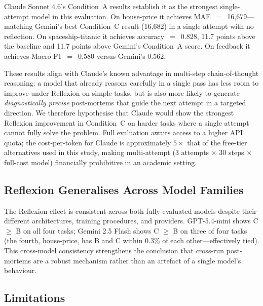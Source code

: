 \documentclass[conference]{IEEEtran}
\begin{document}
Claude Sonnet 4.6's Condition~A results establish it as the strongest
single-attempt model in this evaluation. On house-price it achieves
MAE~$=$~16{,}679---matching Gemini's best Condition~C result (16{,}682)
in a single attempt with no reflection. On spaceship-titanic it achieves
accuracy~$=$~0.828, 11.7 points above the baseline and 11.7 points above
Gemini's Condition~A score. On feedback it achieves Macro-F1~$=$~0.580
versus Gemini's 0.562.

These results align with Claude's known advantage in multi-step
chain-of-thought reasoning: a model that already reasons carefully in a
single pass has less room to improve under Reflexion on simple tasks, but
is also more likely to generate \emph{diagnostically precise} post-mortems
that guide the next attempt in a targeted direction. We therefore hypothesise
that Claude would show the strongest Reflexion improvement in Condition~C on
harder tasks where a single attempt cannot fully solve the problem. Full
evaluation awaits access to a higher API quota; the cost-per-token for Claude
is approximately $5\times$ that of the free-tier alternatives used in this
study, making multi-attempt (3 attempts $\times$ 30 steps $\times$ full-cost
model) financially prohibitive in an academic setting.

\subsection{Reflexion Generalises Across Model Families}

The Reflexion effect is consistent across both fully evaluated models despite
their different architectures, training procedures, and providers. GPT-5.4-mini
shows C $\geq$ B on all four tasks; Gemini 2.5 Flash shows C $\geq$ B on three
of four tasks (the fourth, house-price, has B and C within 0.3\% of each
other---effectively tied). This cross-model consistency strengthens the
conclusion that cross-run post-mortems are a robust mechanism rather than an
artefact of a single model's behaviour.

\subsection{Limitations}
\end{document}

